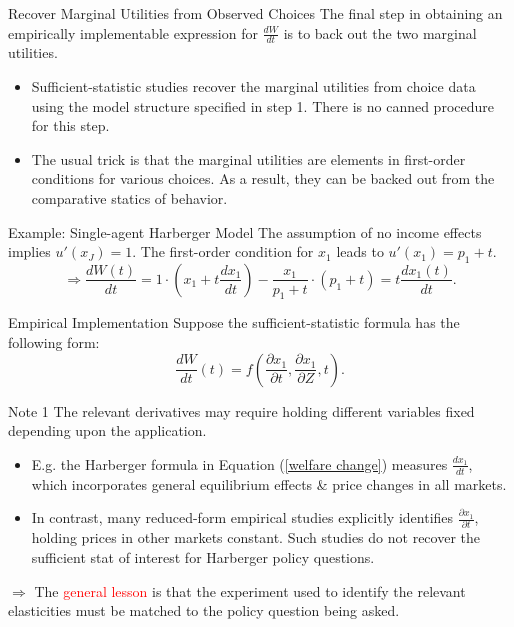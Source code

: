 \documentclass{beamer}
\begin{document}
\begin{frame}[label=ex_hgb_back]{Recover Marginal Utilities from Observed Choices}
	The final step in obtaining an empirically implementable expression for $\frac{dW}{dt}$ is to back out the two marginal utilities.
	\begin{itemize}
		\item Sufficient-statistic studies recover the marginal utilities from choice data using the model structure specified in step 1. There is no canned procedure for this step.
		\item The usual trick is that the marginal utilities are elements in first-order conditions for various choices. As a result, they can be backed out from the comparative statics of behavior.\hyperlink{feldstein1999}{}
	\end{itemize}
	\begin{block}{Example: Single-agent Harberger Model \hyperlink{ex_harberger}{}}
		The assumption of no income effects implies $u'(x_J)=1$. The first-order condition for $x_1$ leads to $u'(x_1)=p_1+t$.
		\begin{equation}\nonumber
			\Rightarrow \frac{dW(t)}{dt} = 1\cdot \left(x_1+t\frac{dx_1}{dt}\right)-\frac{x_1}{p_1+t}\cdot (p_1+t) = t\frac{dx_1(t)}{dt}.
		\end{equation}
	\end{block}
\end{frame}
\begin{frame}{Empirical Implementation}
	Suppose the sufficient-statistic formula has the following form:
	\begin{equation}\label{eq16}
		\frac{dW}{dt}(t) = f\left(\frac{\partial x_1}{\partial t},\frac{\partial x_1}{\partial Z},t \right).
	\end{equation}
	\begin{block}{Note 1}
		The relevant derivatives may require holding different variables fixed depending upon the application.
		\begin{itemize}
			\item E.g. the Harberger formula in Equation (\ref{welfare change}) measures $\frac{dx_1}{dt}$, which incorporates general equilibrium effects \& price changes in all markets.
			\item In contrast, many reduced-form empirical studies explicitly	identifies $\frac{\partial x_1}{\partial t}$, holding prices in other markets constant. Such studies do not recover the sufficient stat of interest for Harberger policy questions.
		\end{itemize}
		$\Rightarrow$ The \textcolor{red}{general lesson} is that the experiment used to identify the relevant elasticities must be matched to the policy question being asked.
	\end{block}
\end{frame}
\end{document}
